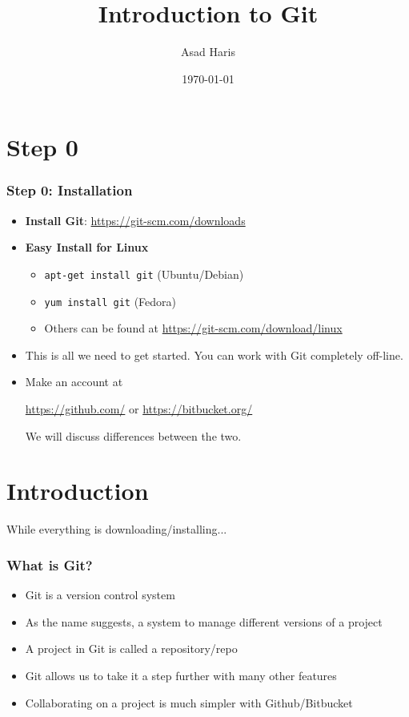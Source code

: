 \documentclass{beamer}
\title[\texttt{Intro to Git}]{Introduction to Git}
\author[Asad Haris]{Asad Haris}
\institute[Dept of Biostatistics]
{Department of Biostatistics \\
University of Washington\\
\medskip
}
\date{\today}
\begin{document}
\begin{frame}
\titlepage
\end{frame}

\section{Step 0}
\begin{frame}
\frametitle{Step 0: Installation}
\begin{itemize}
\item \textbf{Install Git}: \url{https://git-scm.com/downloads}
\item \textbf{Easy Install for Linux}
\begin{itemize}
\item \texttt{apt-get install git} (Ubuntu/Debian)
\item \texttt{yum install git} (Fedora)
\item Others can be found at \url{https://git-scm.com/download/linux}
\end{itemize}

\item This is all we need to get started. You can work with Git completely off-line. 

\pause
\item Make an account at 

\url{https://github.com/} or \url{https://bitbucket.org/} 

We will discuss differences between the two. 
\end{itemize}



\end{frame}

\section{Introduction}

\begin{frame}
\centering
\Large While everything is downloading/installing... 
\end{frame}

\begin{frame}
\frametitle{What is Git?}
\begin{itemize}
\item Git is a version control system
\item As the name suggests, a system to manage different versions of a project
\item A project in Git is called a repository/repo 
\item Git allows us to take it a step further with many other features
\item Collaborating on a project is much simpler with Github/Bitbucket
\end{itemize}
\end{frame}
\end{document}

